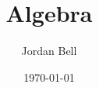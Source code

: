 \documentclass{amsart}
\begin{document}
\title{Algebra}
\author{Jordan Bell}
\address{Toronto, Ontario, Canada}
\date{\today}
\maketitle
\end{document}
